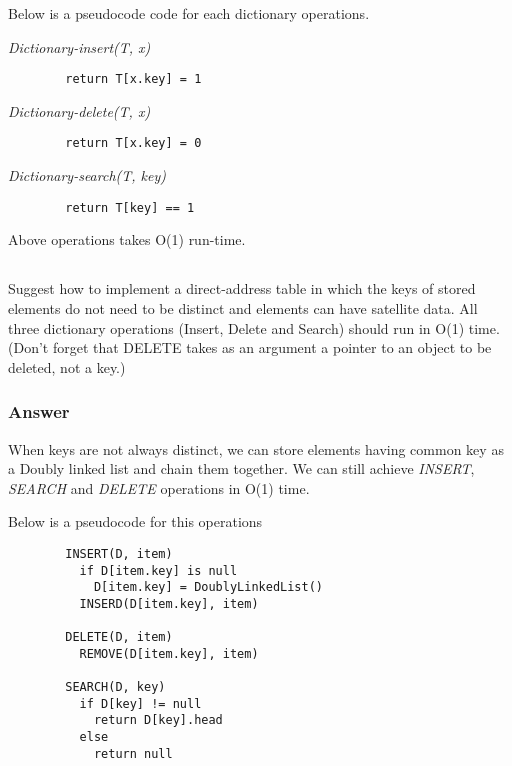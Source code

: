       Below is a pseudocode code for each dictionary operations.

      \textit{Dictionary-insert(T, x)}
        \begin{verbatim}
        return T[x.key] = 1
        \end{verbatim}

      \textit{Dictionary-delete(T, x)}
        \begin{verbatim}
        return T[x.key] = 0
        \end{verbatim}

      \textit{Dictionary-search(T, key)}
        \begin{verbatim}
        return T[key] == 1
        \end{verbatim}

      Above operations takes O(1) run-time.

    \subsection {}

    Suggest how to implement a direct-address table in which the keys of stored
    elements do not need to be distinct and elements can have satellite data.
    All three dictionary operations (Insert, Delete and Search) should run in
    O(1) time. (Don't forget that DELETE takes as an argument a pointer to an
    object to be deleted, not a key.)

      \subsubsection {Answer}

      When keys are not always distinct, we can store elements having common
      key as a Doubly linked list and chain them together. We can still achieve
      \textit{INSERT}, \textit{SEARCH} and \textit{DELETE} operations in O(1)
      time.

      Below is a pseudocode for this operations

      \begin{verbatim}
        INSERT(D, item)
          if D[item.key] is null
            D[item.key] = DoublyLinkedList()
          INSERD(D[item.key], item)

        DELETE(D, item)
          REMOVE(D[item.key], item)

        SEARCH(D, key)
          if D[key] != null
            return D[key].head
          else
            return null
      \end{verbatim}

